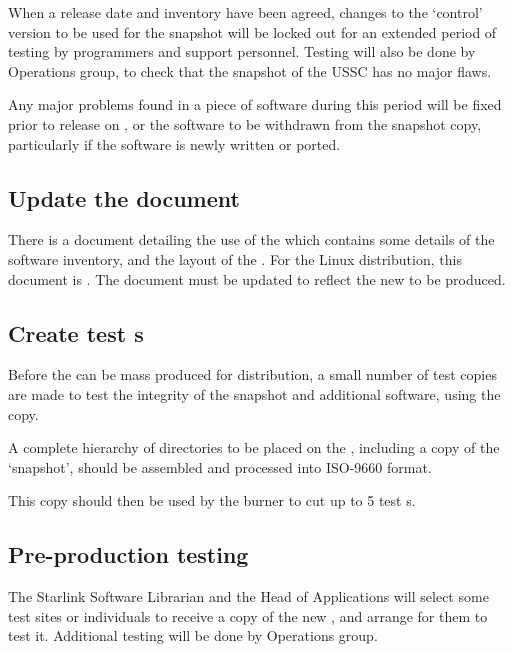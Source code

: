 When a release date and inventory have been agreed, changes to the
`control' version to be used for the snapshot will be locked out for an
extended period of testing by programmers and support personnel.  Testing
will also be done by Operations group, to check that the snapshot of
the USSC has no major flaws.

Any major problems found in a piece of software during this period will
be fixed prior to release on {}, or the software to be
withdrawn from the snapshot copy, particularly if the software is newly
written or ported.

\subsection{\label{update_the_cdrom_document}Update the {} document}

There is a document detailing the use of the {} which
contains some details of the software inventory, and the layout of the
{}.  For the Linux distribution, this document is 
. The document must be updated to reflect the
new {} to be produced.

\subsection{\label{create_test_cdroms}Create test {}s}

Before the {} can be mass produced for distribution, a small
number of test copies are made to test the integrity of the snapshot
and additional software, using the {} copy.

A complete hierarchy of directories to be placed on the {},
including a copy of the `snapshot', should be assembled and processed
into ISO-9660 format.

This copy should then be used by the {} burner to cut up to 5
test {}s.

\subsection{\label{pre-production_testing}Pre-production testing}

The Starlink Software Librarian and the Head of Applications will
select some test sites or individuals to receive a copy of the new
{}, and arrange for them to test it.
Additional testing will be done by Operations group.

